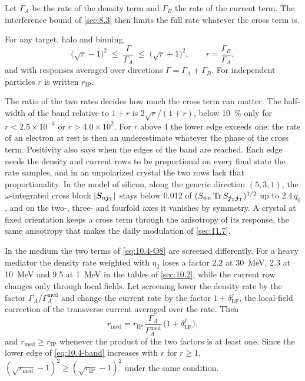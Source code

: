 Let $\varGamma_A$ be the rate of the density term and $\varGamma_B$ the rate of the current term. The interference bound of \cref{sec:8.3} then limits the full rate whatever the cross term is.
\begin{keyresult}
For any target, halo and binning,
\begin{equation}
  \bigl(\sqrt{r} - 1\bigr)^2 \;\le\; \frac{\varGamma}{\varGamma_A} \;\le\; \bigl(\sqrt{r} + 1\bigr)^2 , \qquad r = \frac{\varGamma_B}{\varGamma_A} ,
  \label{eq:10.4-band}
\end{equation}
and with responses averaged over directions $\varGamma = \varGamma_A + \varGamma_B$. For independent particles $r$ is written $r_{\mathrm{IP}}$.
\end{keyresult}
\noindent The ratio of the two rates decides how much the cross term can matter. The half-width of the band relative to $1 + r$ is $2\sqrt r/(1 + r)$, below \SI{10}{\percent} only for $r < 2.5\times10^{-3}$ or $r > 4.0\times10^2$. For $r$ above 4 the lower edge exceeds one: the rate of an electron at rest is then an underestimate whatever the phase of the cross term. Positivity also says when the edges of the band are reached. Each edge needs the density and current rows to be proportional on every final state the rate samples, and in an unpolarized crystal the two rows lack that proportionality. In the model of silicon, along the generic direction $(5,3,1)$, the $\omega$-integrated cross block $|\bm{S}_{n\bm{j}_{\mathrm{T}}}|$ stays below 0.012 of $(S_{nn}\operatorname{Tr} S_{\bm{j}_{\mathrm{T}}\bm{j}_{\mathrm{T}}})^{1/2}$ up to $2.4\,q_0$, and on the two-, three- and fourfold axes it vanishes by symmetry. A crystal at fixed orientation keeps a cross term through the anisotropy of its response, the same anisotropy that makes the daily modulation of \cref{sec:11.7}.

In the medium the two terms of \cref{eq:10.4-O8} are screened differently. For a heavy mediator the density rate weighted with $\eta_2$ loses a factor 2.2 at \SI{30}{MeV}, 2.3 at \SI{10}{MeV} and 9.5 at \SI{1}{MeV} in the tables of \cref{sec:10.2}, while the current row changes only through local fields. Let screening lower the density rate by the factor $\varGamma_A/\varGamma_A^{\mathrm{med}}$ and change the current rate by the factor $1 + \delta^{j}_{\mathrm{LF}}$, the local-field correction of the transverse current averaged over the rate. Then
\begin{equation}
  r_{\mathrm{med}} = r_{\mathrm{IP}}\,\frac{\varGamma_A}{\varGamma_A^{\mathrm{med}}}\,\bigl(1 + \delta^{j}_{\mathrm{LF}}\bigr) ,
  \label{eq:D.30-rmed}
\end{equation}
and $r_{\mathrm{med}} \ge r_{\mathrm{IP}}$ whenever the product of the two factors is at least one. Since the lower edge of \cref{eq:10.4-band} increases with $r$ for $r \ge 1$, $(\sqrt{r_{\mathrm{med}}} - 1)^2 \ge (\sqrt{r_{\mathrm{IP}}} - 1)^2$ under the same condition.

